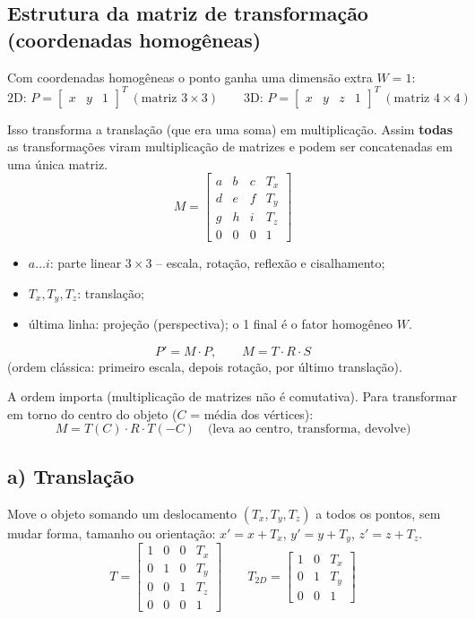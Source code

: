 \documentclass{article}
\begin{document}
\subsection*{Estrutura da matriz de transformação (coordenadas homogêneas)}

Com coordenadas homogêneas o ponto ganha uma dimensão extra $W = 1$:
\[
      \text{2D: } P = \begin{bmatrix} x & y & 1 \end{bmatrix}^T \ (\text{matriz } 3\times3)
      \qquad
      \text{3D: } P = \begin{bmatrix} x & y & z & 1 \end{bmatrix}^T \ (\text{matriz } 4\times4)
\]

Isso transforma a translação (que era uma soma) em multiplicação. Assim \textbf{todas} as transformações viram multiplicação de matrizes e podem ser concatenadas em uma única matriz.
\[
      M =
      \begin{bmatrix}
            a & b & c & T_x \\
            d & e & f & T_y \\
            g & h & i & T_z \\
            0 & 0 & 0 & 1
      \end{bmatrix}
\]
\begin{itemize}
      \item $a \ldots i$: parte linear $3\times3$ -- escala, rotação, reflexão e cisalhamento;
      \item $T_x, T_y, T_z$: translação;
      \item última linha: projeção (perspectiva); o 1 final é o fator homogêneo $W$.
\end{itemize}
\[
      P' = M \cdot P, \qquad M = T \cdot R \cdot S
\]
(ordem clássica: primeiro escala, depois rotação, por último translação).

A ordem importa (multiplicação de matrizes não é comutativa). Para transformar em torno do centro do objeto ($C$ = média dos vértices):
\[
      M = T(C) \cdot R \cdot T(-C) \quad \text{(leva ao centro, transforma, devolve)}
\]

\subsection*{a) Translação}

Move o objeto somando um deslocamento $(T_x, T_y, T_z)$ a todos os pontos, sem mudar forma, tamanho ou orientação: $x' = x + T_x$, $y' = y + T_y$, $z' = z + T_z$.
\[
      T =
      \begin{bmatrix}
            1 & 0 & 0 & T_x \\
            0 & 1 & 0 & T_y \\
            0 & 0 & 1 & T_z \\
            0 & 0 & 0 & 1
      \end{bmatrix}
      \qquad
      T_{2D} =
      \begin{bmatrix}
            1 & 0 & T_x \\
            0 & 1 & T_y \\
            0 & 0 & 1
      \end{bmatrix}
\]
\end{document}
